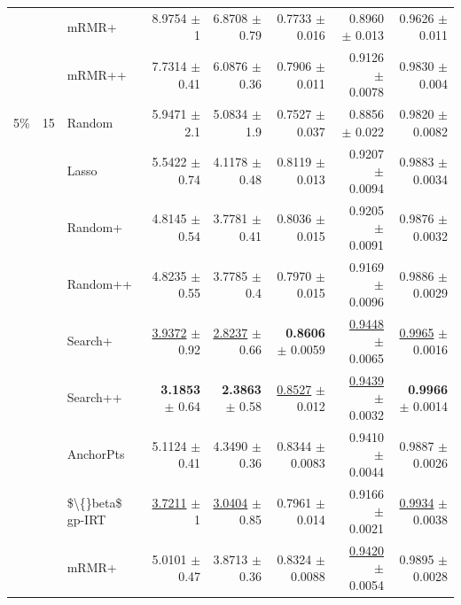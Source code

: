 \begin{longtable}{llp{}rrrrr}
 &  & mRMR+ & 8.9754 {\scriptsize $\pm$ 1} & 6.8708 {\scriptsize $\pm$ 0.79} & 0.7733 {\scriptsize $\pm$ 0.016} & 0.8960 {\scriptsize $\pm$ 0.013} & 0.9626 {\scriptsize $\pm$ 0.011} \\
 &  & mRMR++ & 7.7314 {\scriptsize $\pm$ 0.41} & 6.0876 {\scriptsize $\pm$ 0.36} & 0.7906 {\scriptsize $\pm$ 0.011} & 0.9126 {\scriptsize $\pm$ 0.0078} & 0.9830 {\scriptsize $\pm$ 0.004} \\
\midrule
5\% & 15 & Random & 5.9471 {\scriptsize $\pm$ 2.1} & 5.0834 {\scriptsize $\pm$ 1.9} & 0.7527 {\scriptsize $\pm$ 0.037} & 0.8856 {\scriptsize $\pm$ 0.022} & 0.9820 {\scriptsize $\pm$ 0.0082} \\
 &  & Lasso & 5.5422 {\scriptsize $\pm$ 0.74} & 4.1178 {\scriptsize $\pm$ 0.48} & 0.8119 {\scriptsize $\pm$ 0.013} & 0.9207 {\scriptsize $\pm$ 0.0094} & 0.9883 {\scriptsize $\pm$ 0.0034} \\
 &  & Random+ & 4.8145 {\scriptsize $\pm$ 0.54} & 3.7781 {\scriptsize $\pm$ 0.41} & 0.8036 {\scriptsize $\pm$ 0.015} & 0.9205 {\scriptsize $\pm$ 0.0091} & 0.9876 {\scriptsize $\pm$ 0.0032} \\
 &  & Random++ & 4.8235 {\scriptsize $\pm$ 0.55} & 3.7785 {\scriptsize $\pm$ 0.4} & 0.7970 {\scriptsize $\pm$ 0.015} & 0.9169 {\scriptsize $\pm$ 0.0096} & 0.9886 {\scriptsize $\pm$ 0.0029} \\
 &  & Search+ & \underline{3.9372} {\scriptsize $\pm$ 0.92} & \underline{2.8237} {\scriptsize $\pm$ 0.66} & \textbf{0.8606} {\scriptsize $\pm$ 0.0059} & \underline{0.9448} {\scriptsize $\pm$ 0.0065} & \underline{0.9965} {\scriptsize $\pm$ 0.0016} \\
 &  & Search++ & \textbf{3.1853} {\scriptsize $\pm$ 0.64} & \textbf{2.3863} {\scriptsize $\pm$ 0.58} & \underline{0.8527} {\scriptsize $\pm$ 0.012} & \underline{0.9439} {\scriptsize $\pm$ 0.0032} & \textbf{0.9966} {\scriptsize $\pm$ 0.0014} \\
 &  & AnchorPts & 5.1124 {\scriptsize $\pm$ 0.41} & 4.3490 {\scriptsize $\pm$ 0.36} & 0.8344 {\scriptsize $\pm$ 0.0083} & 0.9410 {\scriptsize $\pm$ 0.0044} & 0.9887 {\scriptsize $\pm$ 0.0026} \\
 &  & \$\textbackslash\{\}beta\$ gp-IRT & \underline{3.7211} {\scriptsize $\pm$ 1} & \underline{3.0404} {\scriptsize $\pm$ 0.85} & 0.7961 {\scriptsize $\pm$ 0.014} & 0.9166 {\scriptsize $\pm$ 0.0021} & \underline{0.9934} {\scriptsize $\pm$ 0.0038} \\
 &  & mRMR+ & 5.0101 {\scriptsize $\pm$ 0.47} & 3.8713 {\scriptsize $\pm$ 0.36} & 0.8324 {\scriptsize $\pm$ 0.0088} & \underline{0.9420} {\scriptsize $\pm$ 0.0054} & 0.9895 {\scriptsize $\pm$ 0.0028} \\

\end{longtable}
